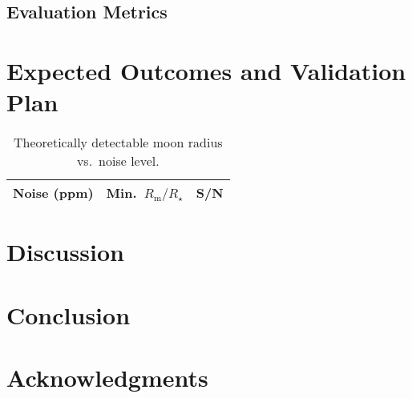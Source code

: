 \documentclass[11pt]{article}
\begin{document}
\subsection{Evaluation Metrics}
\label{sec:metrics}

\section{Expected Outcomes and Validation Plan}
\label{sec:expected}

\begin{table}[ht]
    \centering
    \caption{Theoretically detectable moon radius vs.\ noise level.}
    \label{tab:snr}
    \begin{tabular}{ccc}
        \hline
        Noise (ppm) & Min.\ $R_\mathrm{m}/R_\star$ & S/N\\
        \hline
        \hline
    \end{tabular}
\end{table}


\section{Discussion}
\label{sec:discussion}

\section{Conclusion}
\label{sec:conclusion}

\section*{Acknowledgments}


\end{document}
